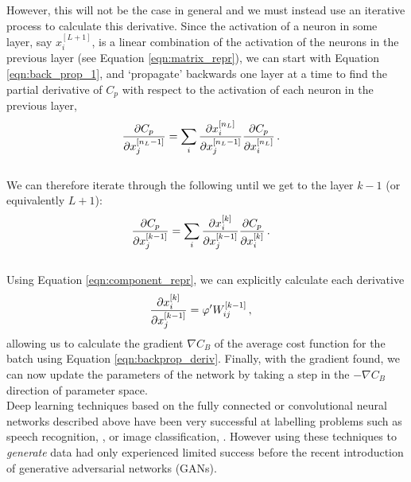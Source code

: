 \documentclass[11pt,a4paper,onecolumn]{report}
\begin{document}
However, this will not be the case in general and we must instead use an
iterative process to calculate this derivative. Since the activation of a neuron
in some layer, say \(x_i^{[L+1]}\), is a linear combination of the activation of
the neurons in the previous layer (see Equation \ref{eqn:matrix_repr}), we can
start with Equation \ref{eqn:back_prop_1}, and `propagate' backwards one layer
at a time to find the partial derivative of \(C_p\) with respect to the
activation of each neuron in the previous layer,
\begin{align}
  \partialderivative{C_p}{x_j^{[n_L - 1]}}
  &= \sum\limits_i \partialderivative{x_i^{[n_L]}}{x_j^{[n_L - 1]}}
  \partialderivative{C_p}{x_i^{[n_L]}} \,.
  \label{eqn:back_prop_2}
\end{align}
\\

\noindent We can therefore iterate through the following until we get to the layer
\(k-1\) (or equivalently \(L+1\)):
\begin{align}
  \partialderivative{C_p}{x_j^{[k - 1]}}
  &= \sum\limits_i \partialderivative{x_i^{[k]}}{x_j^{[k - 1]}}
  \partialderivative{C_p}{x_i^{[k]}}\,.
  \label{eqn:back_prop_3}
\end{align}
\\

\noindent Using Equation \ref{eqn:component_repr}, we can explicitly calculate each derivative
\begin{align}
  \partialderivative{x_i^{[k]}}{x_j^{[k - 1]}}
  &= \varphi'W_{ij}^{[k-1]}\,,
\end{align}
allowing us to calculate the gradient \(\nabla C_B\) of the average cost
function for the batch using Equation \ref{eqn:backprop_deriv}. Finally, with
the gradient found, we can now update the parameters of the network by taking a
step in the \(-\nabla C_B\) direction of parameter space. \\

Deep learning techniques based on the fully connected or convolutional neural
networks described above have been very successful at labelling problems such as
speech recognition, \citep{Hinton2012}, or image classification,
\citep{Krizhevsky2012}. However using these techniques to \textit{generate}
data had only experienced limited success before the recent introduction of
generative adversarial networks (GANs).\\
\end{document}
